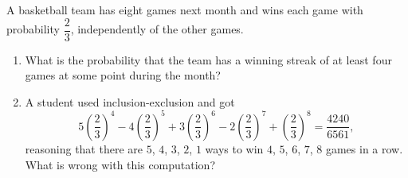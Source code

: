 A basketball team has eight games next month and wins each game with probability $\dfrac{2}{3}$, independently of the other games.
\begin{enumerate}
\item[(a)] What is the probability that the team has a winning streak of at least four games at some point during the month?
\item[(b)] A student used inclusion-exclusion and got
\[5\left(\dfrac{2}{3}\right)^4-4\left(\dfrac{2}{3}\right)^5+3\left(\dfrac{2}{3}\right)^6-2\left(\dfrac{2}{3}\right)^7+\left(\dfrac{2}{3}\right)^8=\dfrac{4240}{6561},\]
reasoning that there are $5$, $4$, $3$, $2$, $1$ ways to win $4$, $5$, $6$, $7$, $8$ games in a row. What is wrong with this computation?
\end{enumerate}
